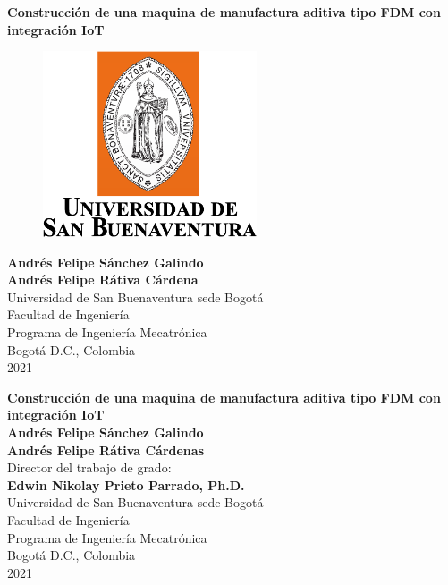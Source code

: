 \cleardoublepage

\thispagestyle{empty} 
\begin{center}
\textbf{ 
\huge{Construcción de una maquina de manufactura aditiva tipo FDM con integración IoT}}\\[1.0cm]


\begin{figure}[htbp]
	\centering
		\includegraphics[height=5.5cm,keepaspectratio]{OtrosTex/LogoUSB}
\end{figure}

\vspace*{2.5cm} 
\Large\textbf{Andrés Felipe Sánchez Galindo \\ Andrés Felipe Rátiva Cárdena }\\[1.0cm]

\vspace*{2cm} 
\Large{Universidad de San Buenaventura sede Bogotá}\\
\Large{Facultad de Ingeniería}\\
\Large{Programa de Ingeniería Mecatrónica}\\
\large{Bogotá D.C., Colombia\\
2021}\\
\end{center}

\newpage{\pagestyle{empty}\cleardoublepage}
\newpage

\begin{center}
\thispagestyle{empty} \vspace*{0cm} \textbf{\huge
Construcción de una maquina de manufactura aditiva tipo FDM con integración IoT}\\[2cm]
\vspace*{1cm}
\Large\textbf{Andrés Felipe Sánchez Galindo \\ Andrés Felipe Rátiva Cárdenas }\\[2.5cm]
\large{Director del trabajo de grado:}\\%
\large\textbf{Edwin Nikolay Prieto Parrado, Ph.D.}\\[1.5cm]



\vspace*{2.5cm}
\Large{Universidad de San Buenaventura sede Bogotá}\\
\Large{Facultad de Ingeniería}\\
\Large{Programa de Ingeniería Mecatrónica}\\
\large{Bogotá D.C., Colombia\\
2021}\\
\end{center}


%
